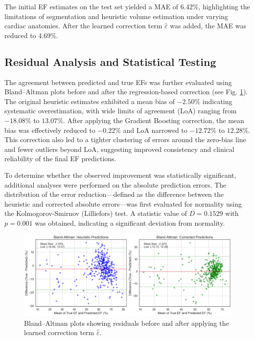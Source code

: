 \documentclass[runningheads]{llncs}
\begin{document}
The initial EF estimates on the test set yielded a MAE of 6.42\%, highlighting the limitations of segmentation and heuristic volume estimation under varying cardiac anatomies. After the learned correction term $\hat{\varepsilon}$ was added, the MAE was reduced to 4.69\%. 

\subsection{Residual Analysis and Statistical Testing}

The agreement between predicted and true EFs was further evaluated using Bland–Altman plots before and after the regression-based correction (see Fig. \ref{fig:bland-altman}). The original heuristic estimates exhibited a mean bias of $-2.50\%$ indicating systematic overestimation, with wide limits of agreement (LoA) ranging from $-18.08\%$ to $13.07\%$. After applying the Gradient Boosting correction, the mean bias was effectively reduced to $-0.22\%$ and LoA narrowed to $-12.72\%$ to $12.28\%$. This correction also led to a tighter clustering of errors around the zero-bias line and fewer outliers beyond LoA, suggesting improved consistency and clinical reliability of the final EF predictions.

To determine whether the observed improvement was statistically significant, additional analyses were performed on the absolute prediction errors. The distribution of the error reduction—defined as the difference between the heuristic and corrected absolute errors—was first evaluated for normality using the Kolmogorov-Smirnov (Lilliefors) test. A statistic value of $D=0.1529$ with $p=0.001$ was obtained, indicating a significant deviation from normality. 

\begin{figure}
    \centering
    \includegraphics[width=1\linewidth]{bland-altman.png}
    \caption{Bland–Altman plots showing residuals before and after applying the learned correction term $\hat{\varepsilon}$.}
    \label{fig:bland-altman}
\end{figure}
\end{document}
